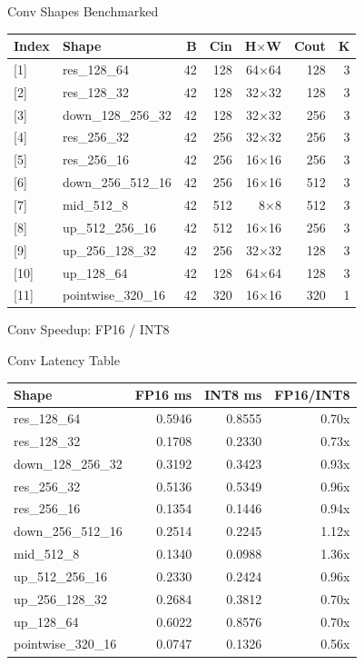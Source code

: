 \documentclass[aspectratio=169]{beamer}
\begin{document}
\begin{frame}{Conv Shapes Benchmarked}
\scriptsize
\begin{tabular}{llrrrrr}
\toprule
Index & Shape & B & Cin & H$\times$W & Cout & K \\
\midrule
{[1]} & res\_128\_64 & 42 & 128 & 64$\times$64 & 128 & 3 \\
{[2]} & res\_128\_32 & 42 & 128 & 32$\times$32 & 128 & 3 \\
{[3]} & down\_128\_256\_32 & 42 & 128 & 32$\times$32 & 256 & 3 \\
{[4]} & res\_256\_32 & 42 & 256 & 32$\times$32 & 256 & 3 \\
{[5]} & res\_256\_16 & 42 & 256 & 16$\times$16 & 256 & 3 \\
{[6]} & down\_256\_512\_16 & 42 & 256 & 16$\times$16 & 512 & 3 \\
{[7]} & mid\_512\_8 & 42 & 512 & 8$\times$8 & 512 & 3 \\
{[8]} & up\_512\_256\_16 & 42 & 512 & 16$\times$16 & 256 & 3 \\
{[9]} & up\_256\_128\_32 & 42 & 256 & 32$\times$32 & 128 & 3 \\
{[10]} & up\_128\_64 & 42 & 128 & 64$\times$64 & 128 & 3 \\
{[11]} & pointwise\_320\_16 & 42 & 320 & 16$\times$16 & 320 & 1 \\
\bottomrule
\end{tabular}
\end{frame}

\begin{frame}{Conv Speedup: FP16 / INT8}
\centering

\end{frame}

\begin{frame}{Conv Latency Table}
\scriptsize
\begin{tabular}{lrrr}
\toprule
Shape & FP16 ms & INT8 ms & FP16/INT8 \\
\midrule
res\_128\_64 & 0.5946 & 0.8555 & 0.70x \\
res\_128\_32 & 0.1708 & 0.2330 & 0.73x \\
down\_128\_256\_32 & 0.3192 & 0.3423 & 0.93x \\
res\_256\_32 & 0.5136 & 0.5349 & 0.96x \\
res\_256\_16 & 0.1354 & 0.1446 & 0.94x \\
down\_256\_512\_16 & 0.2514 & 0.2245 & 1.12x \\
mid\_512\_8 & 0.1340 & 0.0988 & 1.36x \\
up\_512\_256\_16 & 0.2330 & 0.2424 & 0.96x \\
up\_256\_128\_32 & 0.2684 & 0.3812 & 0.70x \\
up\_128\_64 & 0.6022 & 0.8576 & 0.70x \\
pointwise\_320\_16 & 0.0747 & 0.1326 & 0.56x \\
\bottomrule
\end{tabular}
\end{frame}
\end{document}

